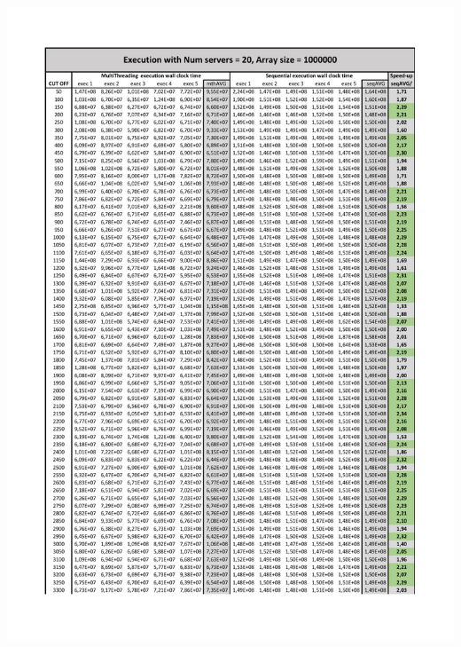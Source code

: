 \documentclass{article}
\begin{document}
\begingroup
\centering
\vspace*{-0.3in}
\hspace*{-0.5in}
\includegraphics[page=1, width=0.9\linewidth]{imgs/CutOffAnalysis01.pdf}
\end{document}
